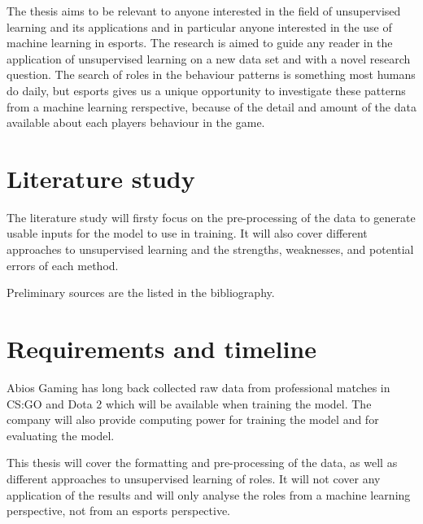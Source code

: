 \documentclass{article}
\begin{document}
The thesis aims to be relevant to anyone interested in the field of unsupervised learning and its applications and in particular anyone interested in the use of machine learning in esports. The research is aimed to guide any reader in the application of unsupervised learning on a new data set and with a novel research question. The search of roles in the behaviour patterns is something most humans do daily, but esports gives us a unique opportunity to investigate these patterns from a machine learning rerspective, because of the detail and amount of the data available about each players behaviour in the game.

\section{Literature study}
The literature study will firsty focus on the pre-processing of the data to generate usable inputs for the model to use in training. It will also cover different approaches to unsupervised learning and the strengths, weaknesses, and potential errors of each method.

Preliminary sources are the listed in the bibliography. \cite{coates2011analysis} \cite{figueiredo2002unsupervised} \cite{hastie2009unsupervised} \cite{10.1007/978-3-319-24589-8_9}

\section{Requirements and timeline}
Abios Gaming has long back collected raw data from professional matches in CS:GO and Dota 2 which will be available when training the model. The company will also provide computing power for training the model and for evaluating the model.

This thesis will cover the formatting and pre-processing of the data, as well as different approaches to unsupervised learning of roles. It will not cover any application of the results and will only analyse the roles from a machine learning perspective, not from an esports perspective.
\end{document}
